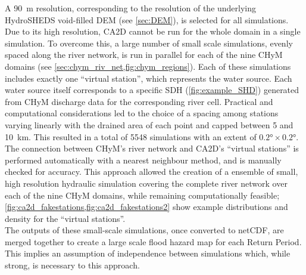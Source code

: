 A \SI{90}{\metre} resolution, corresponding to the resolution of the underlying HydroSHEDS void-filled DEM (see \cref{sec:DEM}), is selected for all simulations.
Due to its high resolution, CA2D cannot be run for the whole domain in a single simulation.
To overcome this, a large number of small scale simulations, evenly spaced along the river network, is run in parallel for each of the nine CHyM domains (see \cref{sec:chym_riv_net,fig:chym_regions}).
Each of these simulations includes exactly one ``virtual station'', which represents the water source.
Each water source itself corresponds to a specific SDH (\cref{fig:example_SHD}) generated from CHyM discharge data for the corresponding river cell.
Practical and computational considerations led to the choice of a spacing among stations varying linearly with the drained area of each point and capped between 5 and \SI{10}{\kilo\meter}.
This resulted in a total of 5548 simulations with an extent of $\ang{0.2}\times\ang{0.2}$.
The connection between CHyM's river network and CA2D's ``virtual stations'' is performed automatically with a nearest neighbour method, and is manually checked for accuracy.
This approach allowed the creation of a ensemble of small, high resolution hydraulic simulation covering the complete river network over each of the nine CHyM domains, while remaining computationally feasible; \cref{fig:ca2d_fakestations,fig:ca2d_fakestations2} show example distributions and density for the  ``virtual stations''.\\
The outputs of these small-scale simulations, once converted to netCDF, are merged together to create a large scale flood hazard map for each Return Period.
This implies an assumption of independence between simulations which, while strong, is necessary to this approach.

